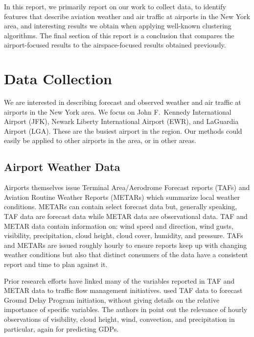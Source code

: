 \documentclass[11pt]{scrartcl}
\begin{document}
In this report, we primarily report on our work to collect data, to identify features that describe aviation weather and air traffic at airports in the New York area, and interesting results we obtain when applying well-known clustering algorithms.  The final section of this report is a conclusion that compares the airport-focused results to the airspace-focused results obtained previously.

\section{Data Collection}
We are interested in describing forecast and observed weather and air traffic at airports in the New York area.  We focus on John F.\ Kennedy International Airport (JFK), Newark Liberty International Airport (EWR), and LaGuardia Airport (LGA).  These are the busiest airport in the region.  Our methods could easily be applied to other airports in the area, or in other areas.

\subsection{Airport Weather Data}
Airports themselves issue Terminal Area/Aerodrome Forecast reports (TAFs) and Aviation Routine Weather Reports (METARs) which summarize local weather conditions. METARs can contain select forecast data but, generally speaking, TAF data are forecast data while METAR data are observational data. TAF and METAR data contain information on: wind speed and direction, wind gusts, visibility, precipitation, cloud height, cloud cover, humidity, and pressure.  TAFs and METARs are issued roughly hourly to ensure reports keep up with changing weather conditions but also that distinct consumers of the data have a consistent report and time to plan against it.

Prior research efforts have linked many of the variables reported in TAF and METAR data to traffic flow management initiatives. \cite{smith2009decision} used TAF data to forecast Ground Delay Program initiation, without giving details on the relative importance of specific variables.  The authors in \cite{mukherjeepredicting} point out the relevance of hourly observations of visibility, cloud height, wind, convection, and precipitation in particular, again for predicting GDPs.
\end{document}
